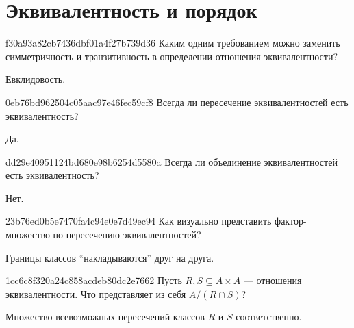 


\section{Эквивалентность и порядок}
\begin{note}{f30a93a82cb7436dbf01a4f27b739d36}
    Каким одним требованием можно заменить симметричность и транзитивность в определении отношения эквивалентности?

    \begin{cloze}{1}
        Евклидовость.
    \end{cloze}
\end{note}

\begin{note}{0eb76bd962504c05aac97e46fec59cf8}
    Всегда ли пересечение эквивалентностей есть эквивалентность?

    \begin{cloze}{1}
        Да.
    \end{cloze}
\end{note}

\begin{note}{dd29e40951124bd680e98b6254d5580a}
    Всегда ли объединение эквивалентностей есть эквивалентность?

    \begin{cloze}{1}
        Нет.
    \end{cloze}
\end{note}

\begin{note}{23b76ed0b5e7470fa4c94e0e7d49ec94}
    Как визуально представить фактор-множество по пересечению эквивалентностей?

    \begin{cloze}{1}
         Границы классов ``накладываются'' друг на друга.
    \end{cloze}
\end{note}

\begin{note}{1cc6c8f320a24c858acdeb80dc2e7662}
    Пусть \({ R, S \subseteq A \times A }\) --- отношения эквивалентности.
    Что представляет из себя \({ A / (R \cap S) }\)?

    \begin{cloze}{1}
        Множество всевозможных пересечений классов \({ R }\) и \({ S }\) соответственно.
    \end{cloze}
\end{note}

